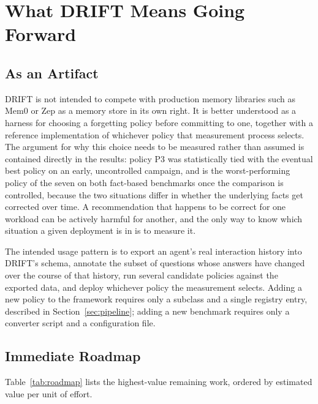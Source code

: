 \section{What DRIFT Means Going Forward}
\label{sec:going-forward}

\subsection{As an Artifact}
\label{sec:as-artifact}

DRIFT is not intended to compete with production memory libraries such as Mem0 or Zep as a memory store in its own right. It is better understood as a harness for choosing a forgetting policy before committing to one, together with a reference implementation of whichever policy that measurement process selects. The argument for why this choice needs to be measured rather than assumed is contained directly in the results: policy P3 was statistically tied with the eventual best policy on an early, uncontrolled campaign, and is the worst-performing policy of the seven on both fact-based benchmarks once the comparison is controlled, because the two situations differ in whether the underlying facts get corrected over time. A recommendation that happens to be correct for one workload can be actively harmful for another, and the only way to know which situation a given deployment is in is to measure it.

The intended usage pattern is to export an agent's real interaction history into DRIFT's schema, annotate the subset of questions whose answers have changed over the course of that history, run several candidate policies against the exported data, and deploy whichever policy the measurement selects. Adding a new policy to the framework requires only a subclass and a single registry entry, described in Section~\ref{sec:pipeline}; adding a new benchmark requires only a converter script and a configuration file.

\subsection{Immediate Roadmap}
\label{sec:roadmap}

Table~\ref{tab:roadmap} lists the highest-value remaining work, ordered by estimated value per unit of effort.

